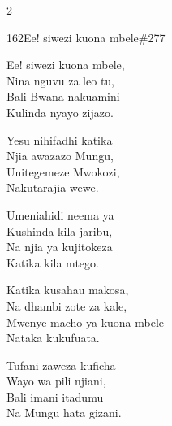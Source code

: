 \documentclass{article}
\begin{document}
\begin{multicols}{2}
\begin{hymn}{162}{Ee! siwezi kuona mbele}{\#277}
\begin{stanza}
Ee! siwezi kuona mbele,\\
Nina nguvu za leo tu,\\
Bali Bwana nakuamini\\
Kulinda nyayo zijazo.
\end{stanza}
\begin{chorus}
Yesu nihifadhi katika\\
Njia awazazo Mungu,\\
Unitegemeze Mwokozi,\\
Nakutarajia wewe.
\end{chorus}
\begin{stanza}
Umeniahidi neema ya\\
Kushinda kila jaribu,\\
Na njia ya kujitokeza\\
Katika kila mtego.
\end{stanza}
\begin{stanza}
Katika kusahau makosa,\\
Na dhambi zote za kale,\\
Mwenye macho ya kuona mbele\\
Nataka kukufuata.
\end{stanza}
\begin{stanza}
Tufani zaweza kuficha\\
Wayo wa pili njiani,\\
Bali imani itadumu\\
Na Mungu hata gizani.
\end{stanza}
\end{hymn}


\end{multicols}
\end{document}
